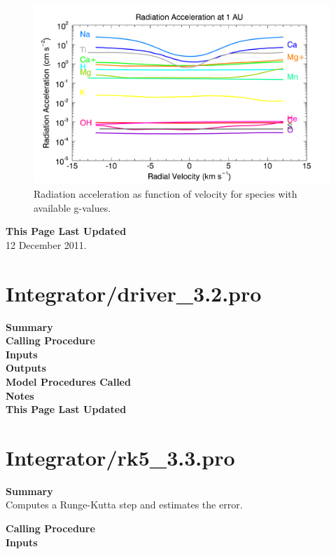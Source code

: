 \documentclass[11pt]{article}
\newcommand\descrip[1]{\textsf{\textbf{\large{#1}}}\\}
\begin{document}
\begin{figure}[b]
\includegraphics[width=\textwidth]{figures/radaccel.png}
\caption{Radiation acceleration as function of velocity for species with
available g-values.}
\label{fig:radaccel}
\end{figure}

\descrip{This Page Last Updated}
12 December 2011.

\clearpage

\section{Integrator/driver\_3.2.pro} \label{sec:driver}

\descrip{Summary}

\descrip{Calling Procedure}

\descrip{Inputs}

\descrip{Outputs}

\descrip{Model Procedures Called}

\descrip{Notes}

\descrip{This Page Last Updated}

\clearpage

\section{Integrator/rk5\_3.3.pro} \label{sec:rk5}

\descrip{Summary}
Computes a Runge-Kutta step and estimates the error.

\descrip{Calling Procedure}

\descrip{Inputs}
\end{document}
